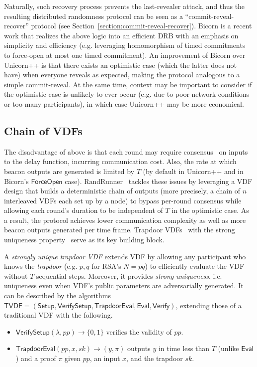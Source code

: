 Naturally, such recovery process prevents the last-revealer attack, and thus the resulting distributed randomness protocol can be seen as a ``commit-reveal-recover'' protocol (see Section~\ref{section:commit-reveal-recover}).
Bicorn is a recent work that realizes the above logic into an efficient DRB with an emphasis on simplicity and efficiency (e.g. leveraging homomorphism of timed commitments~\cite{thyagarajan2021efficient} to force-open at most one timed commitment).
An improvement of Bicorn over Unicorn++ is that there exists an optimistic case (which the latter does not have) when everyone reveals as expected, making the protocol analogous to a simple commit-reveal.
At the same time, context may be important to consider if the optimistic case is unlikely to ever occur (e.g. due to poor network conditions or too many participants), in which case Unicorn++ may be more economical.

\subsection{Chain of VDFs}
\label{subsection:randrunner}
The disadvantage of above is that each round may require consensus~\cite{castro1999practical} on inputs to the delay function, incurring communication cost.
Also, the rate at which beacon outputs are generated is limited by $T$ (by default in Unicorn++ and in Bicorn's $\mathsf{ForceOpen}$ case).
RandRunner~\cite{schindler2021randrunner} tackles these issues by leveraging a VDF design that builds a deterministic chain of outputs (more precisely, a chain of $n$ interleaved VDFs each set up by a node) to bypass per-round consensus while allowing each round's duration to be independent of $T$ in the optimistic case.
As a result, the protocol achieves lower communication complexity as well as more beacon outputs generated per time frame.
Trapdoor VDFs~\cite{wesolowski2019efficient} with the strong uniqueness property~\cite{schindler2021randrunner} serve as its key building block.

\begin{definition}
A \textit{strongly unique trapdoor VDF} extends VDF by allowing any participant who knows the \textit{trapdoor} (e.g. $p, q$ for RSA's $N = p q$) to efficiently evaluate the VDF without $T$ sequential steps. Moreover, it provides \textit{strong uniqueness}, i.e. uniqueness even when VDF's public parameters are adversarially generated. It can be described by the algorithms $\mathsf{TVDF} = (\mathsf{Setup}, \mathsf{VerifySetup}, \mathsf{TrapdoorEval}, \mathsf{Eval}, \mathsf{Verify})$, extending those of a traditional VDF with the following.
\begin{itemize}
    \item $\mathsf{VerifySetup}(\lambda, pp) \rightarrow \{0, 1\}$ verifies the validity of $pp$.
    \item $\mathsf{TrapdoorEval}(pp, x, sk) \rightarrow (y, \pi)$ outputs $y$ in time less than $T$ (unlike $\mathsf{Eval}$) and a proof $\pi$ given $pp$, an input $x$, and the trapdoor $sk$.
\end{itemize}
\end{definition}


